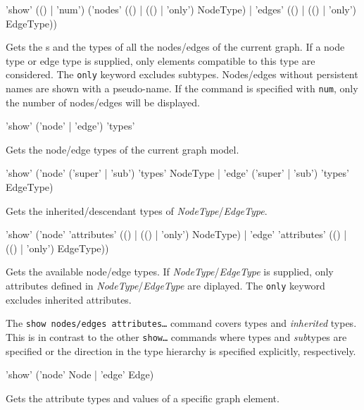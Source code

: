 \begin{rail}
  'show' (() | 'num') ('nodes' (() | (() | 'only') NodeType) | 'edges' (() | (() | 'only') EdgeType))
\end{rail}
Gets the s and the types of all the nodes/edges of the current graph. 
If a node type or edge type is supplied, only elements compatible to this type are considered. 
The \texttt{only} keyword excludes subtypes. Nodes/edges without persistent names are shown with a pseudo-name.
If the command is specified with \texttt{num}, only the number of nodes/edges will be displayed.

\begin{rail}
  'show' ('node' | 'edge') 'types'
\end{rail}
Gets the node/edge types of the current graph model.

\begin{rail}
'show' ('node' ('super' | 'sub') 'types' NodeType | 'edge' ('super' | 'sub') 'types' EdgeType)
\end{rail}
Gets the inherited/descendant types of \emph{NodeType}/\emph{EdgeType}.

\begin{rail}
  'show' ('node' 'attributes' (() | (() | 'only') NodeType) | 'edge' 'attributes' (() | (() | 'only') EdgeType))
\end{rail}
Gets the available node/edge  types.
If \emph{NodeType}/\emph{EdgeType} is supplied, only attributes defined in \emph{NodeType}/\emph{EdgeType} are diplayed.
The \texttt{only} keyword excludes inherited attributes.\\
\begin{note}
The \texttt{show nodes/edges attributes\dots} command covers types and \emph{inherited} types.
This is in contrast to the other \texttt{show\dots} commands where types and \emph{sub}types are specified or the direction in the type hierarchy is specified explicitly, respectively.
\end{note}

\begin{rail}
 'show' ('node' Node | 'edge' Edge)
\end{rail}
Gets the attribute types and values of a specific graph element.

